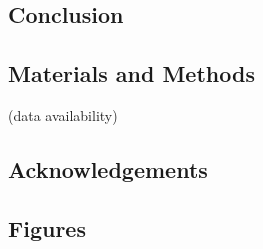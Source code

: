 \documentclass[
]{article}
\begin{document}
\newpage

\hypertarget{conclusion}{%
\subsection{Conclusion}\label{conclusion}}

\newpage

\hypertarget{materials-and-methods}{%
\subsection{Materials and Methods}\label{materials-and-methods}}

(data availability)

\newpage

\hypertarget{acknowledgements}{%
\subsection{Acknowledgements}\label{acknowledgements}}

\newpage

\hypertarget{figures}{%
\subsection{Figures}\label{figures}}
\end{document}
